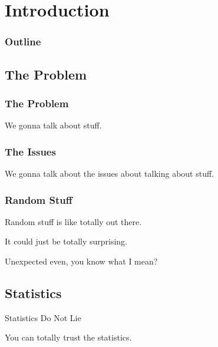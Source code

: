 \section{Introduction}


\begin{frame}
  \frametitle{Outline}
  \tableofcontents[ currentsection ]
\end{frame}

\subsection{The Problem}

\begin{frame}
  \frametitle{The Problem}

  We gonna talk about stuff.

\end{frame}


\begin{frame}
  \frametitle{The Issues}

  We gonna talk about the issues about talking about stuff.

\end{frame}


\begin{frame}
  \frametitle{Random Stuff}

  Random stuff is like totally out there.

  {

    It could just be totally surprising.

  }

  {

    Unexpected even, you know what I mean?

  }


\end{frame}


\subsection{Statistics}

\begin{frame}{Statistics Do Not Lie}

  You can totally trust the statistics.




\end{frame}


